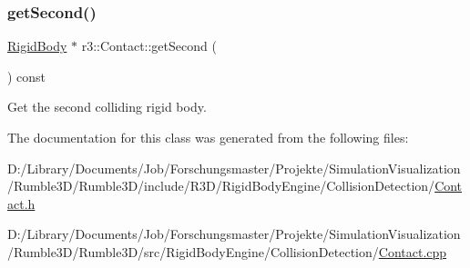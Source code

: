 \subsubsection{\texorpdfstring{get\+Second()}{getSecond()}}
{\footnotesize\ttfamily \mbox{\hyperlink{classr3_1_1_rigid_body}{Rigid\+Body}} $\ast$ r3\+::\+Contact\+::get\+Second (\begin{DoxyParamCaption}{ }\end{DoxyParamCaption}) const}

Get the second colliding rigid body. 

The documentation for this class was generated from the following files\+:\begin{DoxyCompactItemize}
\item 
D\+:/\+Library/\+Documents/\+Job/\+Forschungsmaster/\+Projekte/\+Simulation\+Visualization/\+Rumble3\+D/\+Rumble3\+D/include/\+R3\+D/\+Rigid\+Body\+Engine/\+Collision\+Detection/\mbox{\hyperlink{_contact_8h}{Contact.\+h}}\item 
D\+:/\+Library/\+Documents/\+Job/\+Forschungsmaster/\+Projekte/\+Simulation\+Visualization/\+Rumble3\+D/\+Rumble3\+D/src/\+Rigid\+Body\+Engine/\+Collision\+Detection/\mbox{\hyperlink{_contact_8cpp}{Contact.\+cpp}}\end{DoxyCompactItemize}
